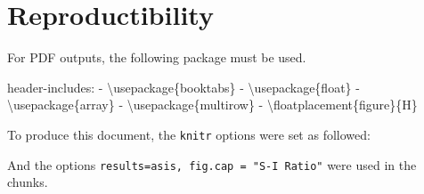 \documentclass[
]{article}
\newenvironment{Shaded}{\begin{snugshade}}{\end{snugshade}}
\newcommand{\AttributeTok}[1]{\textcolor[rgb]{0.77,0.63,0.00}{#1}}
\newcommand{\ConstantTok}[1]{\textcolor[rgb]{0.00,0.00,0.00}{#1}}
\newcommand{\FunctionTok}[1]{\textcolor[rgb]{0.00,0.00,0.00}{#1}}
\newcommand{\NormalTok}[1]{#1}
\newcommand{\SpecialCharTok}[1]{\textcolor[rgb]{0.00,0.00,0.00}{#1}}
\newcommand{\StringTok}[1]{\textcolor[rgb]{0.31,0.60,0.02}{#1}}
\begin{document}
\hypertarget{reproductibility}{%
\section{Reproductibility}\label{reproductibility}}

For PDF outputs, the following package must be used.

\begin{Shaded}
\begin{Highlighting}[]
\NormalTok{header}\SpecialCharTok{{-}}\NormalTok{includes}\SpecialCharTok{:}
   \SpecialCharTok{{-}}\NormalTok{ \textbackslash{}usepackage\{booktabs\}}
   \SpecialCharTok{{-}}\NormalTok{ \textbackslash{}usepackage\{float\}}
   \SpecialCharTok{{-}}\NormalTok{ \textbackslash{}usepackage\{array\}}
   \SpecialCharTok{{-}}\NormalTok{ \textbackslash{}usepackage\{multirow\}}
   \SpecialCharTok{{-}}\NormalTok{ \textbackslash{}floatplacement\{figure\}\{H\}}
\end{Highlighting}
\end{Shaded}

To produce this document, the \texttt{knitr} options were set as
followed:

\begin{Shaded}
\end{Shaded}

And the options
\texttt{results=\textquotesingle{}asis\textquotesingle{},\ fig.cap\ =\ "S-I\ Ratio"}
were used in the chunks.
\end{document}

